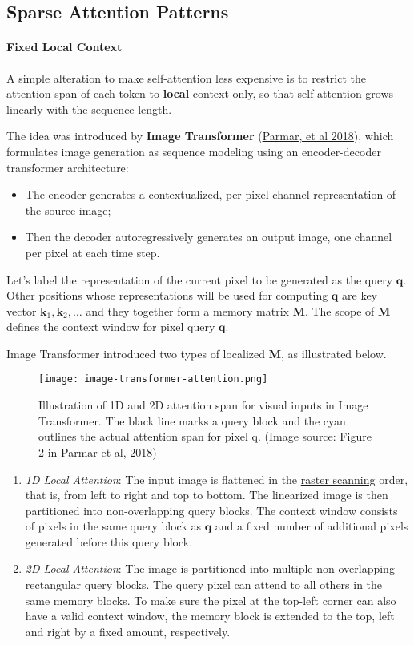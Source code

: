 \documentclass[12pt]{article}
\begin{document}
\subsection{Sparse Attention Patterns}

\paragraph{Fixed Local Context}
A simple alteration to make self-attention less expensive is to restrict the attention span of each token to \textbf{local} context only, so that self-attention grows linearly with the sequence length.

The idea was introduced by \textbf{Image Transformer} (\href{https://arxiv.org/abs/1802.05751}{Parmar, et al 2018}), which formulates image generation as sequence modeling using an encoder-decoder transformer architecture:
\begin{itemize}
    \item The encoder generates a contextualized, per-pixel-channel representation of the source image;
    \item Then the decoder autoregressively generates an output image, one channel per pixel at each time step.
\end{itemize}
Let’s label the representation of the current pixel to be generated as the query $\mathbf{q}$. Other positions whose representations will be used for computing $\mathbf{q}$ are key vector $\mathbf{k}_1, \mathbf{k}_2, \dots$ and they together form a memory matrix $\mathbf{M}$. The scope of $\mathbf{M}$ defines the context window for pixel query $\mathbf{q}$.

Image Transformer introduced two types of localized $\mathbf{M}$, as illustrated below.

\begin{figure}[h!]
    \centering
    \texttt{[image: image-transformer-attention.png]}
    \caption{Illustration of 1D and 2D attention span for visual inputs in Image Transformer. The black line marks a query block and the cyan outlines the actual attention span for pixel q. (Image source: Figure 2 in \href{https://arxiv.org/abs/1802.05751}{Parmar et al, 2018})}
\end{figure}

\begin{enumerate}
    \item \emph{1D Local Attention}: The input image is flattened in the \href{https://en.wikipedia.org/wiki/Raster_scan#Scanning_pattern}{raster scanning} order, that is, from left to right and top to bottom. The linearized image is then partitioned into non-overlapping query blocks. The context window consists of pixels in the same query block as $\mathbf{q}$ and a fixed number of additional pixels generated before this query block.
    \item \emph{2D Local Attention}: The image is partitioned into multiple non-overlapping rectangular query blocks. The query pixel can attend to all others in the same memory blocks. To make sure the pixel at the top-left corner can also have a valid context window, the memory block is extended to the top, left and right by a fixed amount, respectively.
\end{enumerate}
\end{document}
